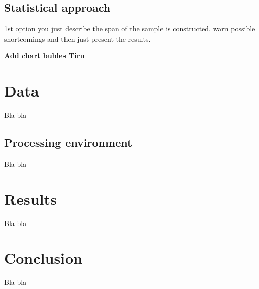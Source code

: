 \documentclass[12pt]{article}
\begin{document}
\subsection{Statistical approach} \label{stats}
1st option you just describe the span of the sample is constructed, warn possible shortcomings and then just present the results.

\textbf{Add chart bubles Tiru}

\section{Data}
Bla bla
\subsection{Processing environment}
Bla bla
\section{Results}
Bla bla
\section{Conclusion}
Bla bla




\end{document}
